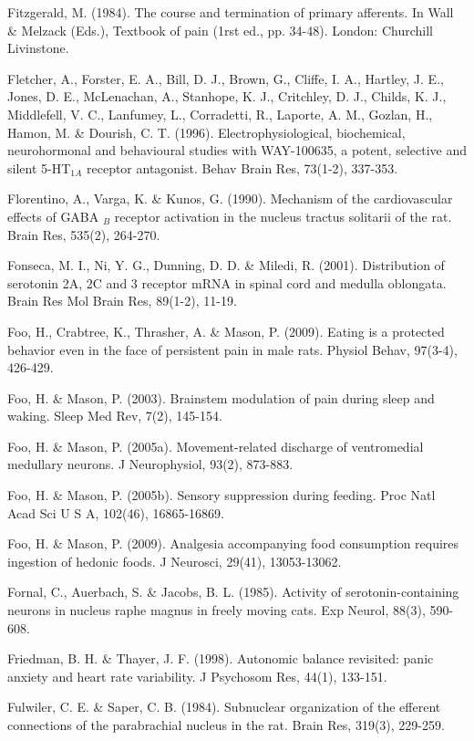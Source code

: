 \documentclass[a4paper,12pt,twoside]{report}
\begin{document}
\begin{singlespacing}
\begin{footnotesize}
Fitzgerald, M. (1984). The course and termination of primary afferents. In Wall \& Melzack (Eds.), Textbook of pain (1rst ed., pp. 34-48). London: Churchill Livinstone.

Fletcher, A., Forster, E. A., Bill, D. J., Brown, G., Cliffe, I. A., Hartley, J. E., Jones, D. E., McLenachan, A., Stanhope, K. J., Critchley, D. J., Childs, K. J., Middlefell, V. C., Lanfumey, L., Corradetti, R., Laporte, A. M., Gozlan, H., Hamon, M. \& Dourish, C. T. (1996). Electrophysiological, biochemical, neurohormonal and behavioural studies with WAY-100635, a potent, selective and silent 5-HT$_{1A}$ receptor antagonist. Behav Brain Res, 73(1-2), 337-353.

Florentino, A., Varga, K. \& Kunos, G. (1990). Mechanism of the cardiovascular effects of GABA $_{B}$ receptor activation in the nucleus tractus solitarii of the rat. Brain Res, 535(2), 264-270.

Fonseca, M. I., Ni, Y. G., Dunning, D. D. \& Miledi, R. (2001). Distribution of serotonin 2A, 2C and 3 receptor mRNA in spinal cord and medulla oblongata. Brain Res Mol Brain Res, 89(1-2), 11-19.

Foo, H., Crabtree, K., Thrasher, A. \& Mason, P. (2009). Eating is a protected behavior even in the face of persistent pain in male rats. Physiol Behav, 97(3-4), 426-429.

Foo, H. \& Mason, P. (2003). Brainstem modulation of pain during sleep and waking. Sleep Med Rev, 7(2), 145-154.

Foo, H. \& Mason, P. (2005a). Movement-related discharge of ventromedial medullary neurons. J Neurophysiol, 93(2), 873-883.

Foo, H. \& Mason, P. (2005b). Sensory suppression during feeding. Proc Natl Acad Sci U S A, 102(46), 16865-16869.

Foo, H. \& Mason, P. (2009). Analgesia accompanying food consumption requires ingestion of hedonic foods. J Neurosci, 29(41), 13053-13062.

Fornal, C., Auerbach, S. \& Jacobs, B. L. (1985). Activity of serotonin-containing neurons in nucleus raphe magnus in freely moving cats. Exp Neurol, 88(3), 590-608.

Friedman, B. H. \& Thayer, J. F. (1998). Autonomic balance revisited: panic anxiety and heart rate variability. J Psychosom Res, 44(1), 133-151.

Fulwiler, C. E. \& Saper, C. B. (1984). Subnuclear organization of the efferent connections of the parabrachial nucleus in the rat. Brain Res, 319(3), 229-259.


\end{footnotesize}
\end{singlespacing}
\end{document}
